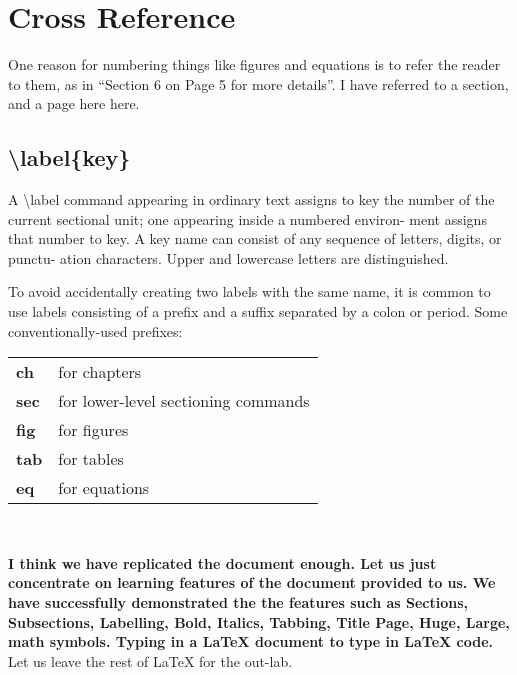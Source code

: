\documentclass[11pt,a4paper]{article}
\begin{document}
\section{Cross Reference}
One reason for numbering things like figures and equations is to refer
the reader to them, as in “Section 6 on Page 5 for more details”. I
have referred to a section, and a page here here.
\subsection {\textbackslash label\{key\}}
A \textbackslash label command appearing in ordinary text assigns to key the number
of the current sectional unit; one appearing inside a numbered environ-
ment assigns that number to key.
A key name can consist of any sequence of letters, digits, or punctu-
ation characters. Upper and lowercase letters are distinguished.

To avoid accidentally creating two labels with the same name, it is
common to use labels consisting of a prefix and a suffix separated by a
colon or period. Some conventionally-used prefixes:\\
\linebreak
\begin{tabular}{>{\bfseries}l l}
ch & for chapters \\
sec & for lower-level sectioning commands \\
fig & for figures \\
tab & for tables \\
eq & for equations \\
\end{tabular}
\\
\linebreak
\linebreak


\textbf{\LARGE{
I think we have replicated the document enough. Let us just concentrate on learning features of the document provided to us. We have successfully demonstrated the the features such as Sections, Subsections, Labelling, Bold, Italics, Tabbing, Title Page, Huge, Large, math symbols. Typing in a \LaTeX{} document to type in \textbf{LaTeX} code.}}\\


Let us leave the rest of \LaTeX{} for the out-lab.
\end{document}
